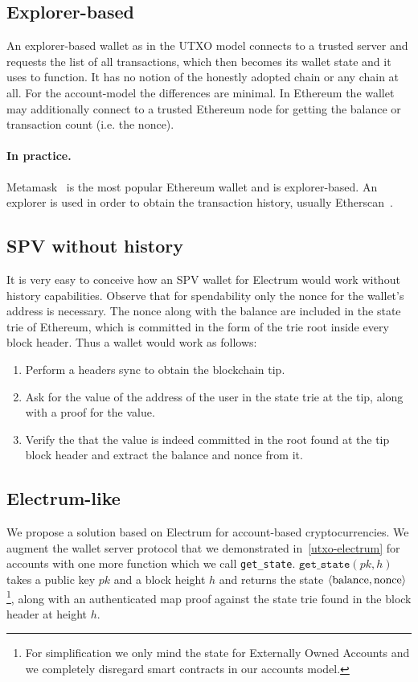 \subsection{Explorer-based}
An explorer-based wallet as in the UTXO model connects to a trusted server and requests the list of all transactions, which then becomes its wallet state and it uses to function. It has no notion of the honestly adopted chain or any chain at all. For the account-model the differences are minimal. In Ethereum the wallet may additionally connect to a trusted Ethereum node for getting the balance or transaction count (i.e. the nonce).

\paragraph{In practice.}
Metamask~\cite{metamask} is the most popular Ethereum wallet and is explorer-based. An explorer is used in order to obtain the transaction history, usually Etherscan~\cite{etherscan}.

\subsection{SPV without history}
It is very easy to conceive how an SPV wallet for Electrum would work without history capabilities. Observe that for spendability only the nonce for the wallet's address is necessary. The nonce along with the balance are included in the state trie of Ethereum, which is committed in the form of the trie root inside every block header. Thus a wallet would work as follows:

\begin{enumerate}
    \item Perform a headers sync to obtain the blockchain tip.
    \item Ask for the value of the address of the user in the state trie at the tip, along with a proof for the value.
    \item Verify the that the value is indeed committed in the root found at the tip block header and extract the balance and nonce from it.
\end{enumerate}

\subsection{Electrum-like}
We propose a solution based on Electrum for account-based cryptocurrencies. We augment the wallet server protocol that we demonstrated in~\cref{utxo-electrum} for accounts with one more function which we call \texttt{get\_state}. $\texttt{get\_state}(pk, h)$ takes a public key $pk$ and a block height $h$ and returns the state $\langle\text{balance}, \text{nonce}\rangle$\footnote{For simplification we only mind the state for Externally Owned Accounts and we completely disregard smart contracts in our accounts model.}, along with an authenticated map proof against the state trie found in the block header at height $h$.

